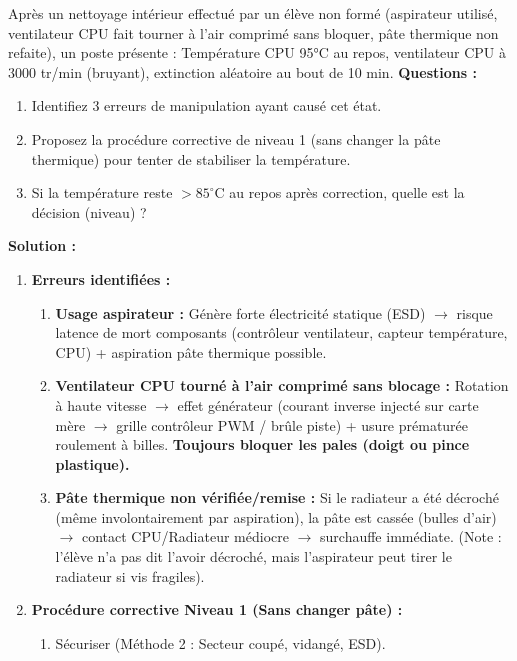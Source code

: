 \documentclass[11pt]{article}
\begin{document}
\begin{exoresolu}
Après un nettoyage intérieur effectué par un élève non formé (aspirateur utilisé, ventilateur CPU fait tourner à l'air comprimé sans bloquer, pâte thermique non refaite), un poste présente : Température CPU 95°C au repos, ventilateur CPU à 3000 tr/min (bruyant), extinction aléatoire au bout de 10 min.
\textbf{Questions :}
\begin{enumerate}
    \item Identifiez 3 erreurs de manipulation ayant causé cet état.
    \item Proposez la procédure corrective de niveau 1 (sans changer la pâte thermique) pour tenter de stabiliser la température.
    \item Si la température reste $> 85^\circ$C au repos après correction, quelle est la décision (niveau) ?
\end{enumerate}
\tcblower
\textbf{Solution :}
\begin{enumerate}
    \item \textbf{Erreurs identifiées :}
          \begin{enumerate}
              \item \textbf{Usage aspirateur :} Génère forte électricité statique (ESD) $\rightarrow$ risque latence de mort composants (contrôleur ventilateur, capteur température, CPU) + aspiration pâte thermique possible.
              \item \textbf{Ventilateur CPU tourné à l'air comprimé sans blocage :} Rotation à haute vitesse $\rightarrow$ effet générateur (courant inverse injecté sur carte mère $\rightarrow$ grille contrôleur PWM / brûle piste) + usure prématurée roulement à billes. \textbf{Toujours bloquer les pales (doigt ou pince plastique).}
              \item \textbf{Pâte thermique non vérifiée/remise :} Si le radiateur a été décroché (même involontairement par aspiration), la pâte est cassée (bulles d'air) $\rightarrow$ contact CPU/Radiateur médiocre $\rightarrow$ surchauffe immédiate. (Note : l'élève n'a pas dit l'avoir décroché, mais l'aspirateur peut tirer le radiateur si vis fragiles).
          \end{enumerate}
    \item \textbf{Procédure corrective Niveau 1 (Sans changer pâte) :}
          \begin{enumerate}
              \item Sécuriser (Méthode 2 : Secteur coupé, vidangé, ESD).

\end{enumerate}
\end{enumerate}
\end{exoresolu}
\end{document}
